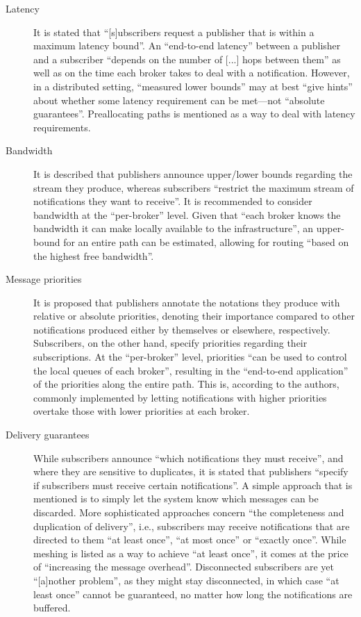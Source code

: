 \documentclass[article, 10pt, type=bsc, colorback, accentcolor=tud8b, parskip=half, bibliography=totocnumbered]{tudthesis}
\begin{document}
\begin{description}
\item[Latency]
It is stated that ``[s]ubscribers request a publisher that is within a maximum latency bound''.
An ``end-to-end latency'' between a publisher and a subscriber ``depends on the number of [...] hops between them'' as well as on the time each broker takes to deal with a notification.
However, in a distributed setting, ``measured lower bounds'' may at best ``give hints'' about whether some latency requirement can be met---not ``absolute guarantees''.
Preallocating paths is mentioned as a way to deal with latency requirements.
\item[Bandwidth]
It is described that publishers announce upper/lower bounds regarding the stream they produce, whereas subscribers ``restrict the maximum stream of notifications they want to receive''.
It is recommended to consider bandwidth at the ``per-broker'' level.
Given that ``each broker knows the bandwidth it can make locally available to the infrastructure'', an upper-bound for an entire path can be estimated, allowing for routing ``based on the highest free bandwidth''.
\item[Message priorities]
It is proposed that publishers annotate the notations they produce with relative or absolute priorities, denoting their importance compared to other notifications produced either by themselves or elsewhere, respectively.
Subscribers, on the other hand, specify priorities regarding their subscriptions.
At the ``per-broker'' level, priorities ``can be used to control the local queues of each broker'', resulting in the ``end-to-end application'' of the priorities along the entire path.
This is, according to the authors, commonly implemented by letting notifications with higher priorities overtake those with lower priorities at each broker.
\item[Delivery guarantees]
While subscribers announce ``which notifications they must receive'', and where they are sensitive to duplicates, it is stated that publishers ``specify if subscribers must receive certain notifications''.
A simple approach that is mentioned is to simply let the system know which messages can be discarded.
More sophisticated approaches concern ``the completeness and duplication of delivery'', i.e., subscribers may receive notifications that are directed to them ``at least once'', ``at most once'' or ``exactly once''.
While meshing is listed as a way to achieve ``at least once'', it comes at the price of ``increasing the message overhead''.
Disconnected subscribers are yet ``[a]nother problem'', as they might stay disconnected, in which case ``at least once'' cannot be guaranteed, no matter how long the notifications are buffered.

\end{description}
\end{document}

